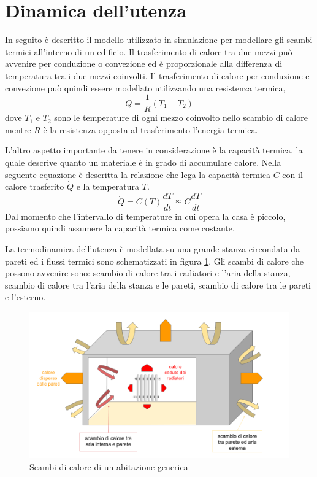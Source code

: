\documentclass[laurea,oneside,11pt]{USiena_tesiLM}
\begin{document}
\section{Dinamica dell'utenza}
\label{sec:dinamicautenza}
In seguito è descritto il modello utilizzato in simulazione per modellare gli scambi termici all'interno di un edificio. 
Il trasferimento di calore tra due mezzi può avvenire per conduzione o convezione ed è proporzionale alla differenza di temperatura tra i due mezzi coinvolti. Il trasferimento di calore per conduzione e convezione può quindi essere modellato utilizzando una resistenza termica,
\begin{equation}
\dot{Q} = \frac{1}{R} (T_1-T_2)
\label{eq:q1}
\end{equation}
dove $T_1$ e $T_2$ sono le temperature di ogni mezzo coinvolto nello scambio di calore mentre $R$ è la resistenza opposta al trasferimento l'energia termica.

L'altro aspetto importante da tenere in considerazione è la capacità termica, la quale descrive quanto un materiale  è in grado di accumulare calore. Nella seguente equazione è descritta la relazione che lega la capacità termica $C$ con il calore trasferito $\dot{Q}$ e la temperatura $T$.
\begin{equation}
\dot{Q} = C(T) \frac{dT}{dt} \approxeq C \frac{dT}{dt}
\label{eq:q2}
\end{equation}
Dal momento che l'intervallo di temperature in cui opera la casa è piccolo, possiamo quindi assumere la capacità termica come costante.

La termodinamica dell'utenza è modellata su una grande stanza circondata da pareti ed i flussi termici sono schematizzati in figura \ref{fig:scambio}. Gli scambi di calore che possono avvenire sono: scambio di calore tra i radiatori e l'aria della stanza, scambio di calore tra l'aria della stanza e le pareti, scambio di calore tra le pareti e l'esterno.

\begin{figure}[h]
\begin{center}
\includegraphics[width=1.05\textwidth]{figure/scambio_casa}
\caption{Scambi di calore di un abitazione generica}
\label{fig:scambio}
\end{center}
\end{figure}
\end{document}
